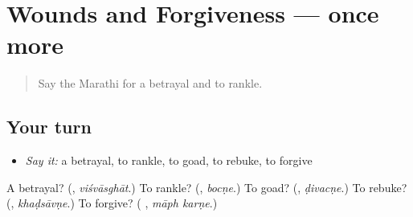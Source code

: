 \section[(dialogue)]{Wounds and Forgiveness — once more}

\label{lesson:MR-R503-review-final-503}



\begin{quote}
Say the Marathi for a betrayal and to rankle.
\end{quote}

\subsection*{Your turn}
\begin{itemize}
\raggedright
  \item \emph{Say it:} a betrayal, to rankle, to goad, to rebuke, to forgive
\end{itemize}

\begin{tcolorbox}[breakable,colback=teal!4,colframe=teal!35!black,title={Before you move on}]
A betrayal? (\textbf{}, \emph{viśvāsghāt}.) To rankle? (\textbf{}, \emph{bocṇe}.) To goad? (\textbf{}, \emph{ḍivacṇe}.) To rebuke? (\textbf{}, \emph{khaḍsāvṇe}.) To forgive? (\textbf{ }, \emph{māph karṇe}.)
\end{tcolorbox}
